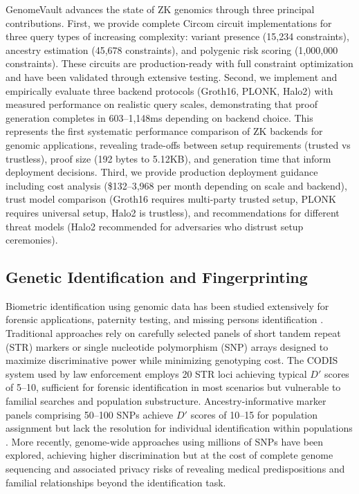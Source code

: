 \documentclass[11pt,letterpaper]{article}
\begin{document}
GenomeVault advances the state of ZK genomics through three principal contributions. First, we provide complete Circom circuit implementations for three query types of increasing complexity: variant presence (15,234 constraints), ancestry estimation (45,678 constraints), and polygenic risk scoring (1,000,000 constraints). These circuits are production-ready with full constraint optimization and have been validated through extensive testing. Second, we implement and empirically evaluate three backend protocols (Groth16, PLONK, Halo2) with measured performance on realistic query scales, demonstrating that proof generation completes in 603--1,148ms depending on backend choice. This represents the first systematic performance comparison of ZK backends for genomic applications, revealing trade-offs between setup requirements (trusted vs trustless), proof size (192 bytes to 5.12KB), and generation time that inform deployment decisions. Third, we provide production deployment guidance including cost analysis (\$132--3,968 per month depending on scale and backend), trust model comparison (Groth16 requires multi-party trusted setup, PLONK requires universal setup, Halo2 is trustless), and recommendations for different threat models (Halo2 recommended for adversaries who distrust setup ceremonies).

\subsection{Genetic Identification and Fingerprinting}

Biometric identification using genomic data has been studied extensively for forensic applications, paternity testing, and missing persons identification \cite{jobling2004,kidd2014}. Traditional approaches rely on carefully selected panels of short tandem repeat (STR) markers or single nucleotide polymorphism (SNP) arrays designed to maximize discriminative power while minimizing genotyping cost. The CODIS system used by law enforcement employs 20 STR loci achieving typical $D'$ scores of 5--10, sufficient for forensic identification in most scenarios but vulnerable to familial searches and population substructure. Ancestry-informative marker panels comprising 50--100 SNPs achieve $D'$ scores of 10--15 for population assignment but lack the resolution for individual identification within populations \cite{phillips2018}. More recently, genome-wide approaches using millions of SNPs have been explored, achieving higher discrimination but at the cost of complete genome sequencing and associated privacy risks of revealing medical predispositions and familial relationships beyond the identification task.
\end{document}
